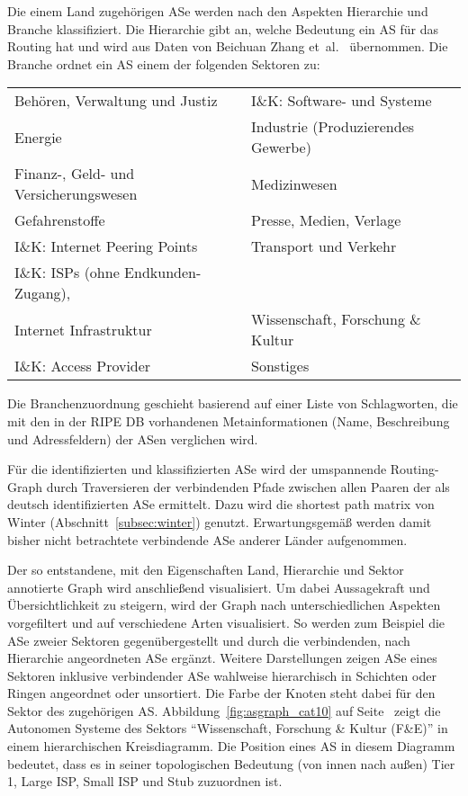 Die einem Land zugehörigen ASe werden nach den Aspekten Hierarchie und Branche klassifiziert.
Die Hierarchie gibt an, welche Bedeutung ein AS für das Routing hat und wird aus Daten von Beichuan Zhang et~al.~\cite{Zhang:2005:CIA:1052812.1052825} übernommen.
Die Branche ordnet ein AS einem der folgenden Sektoren zu:
\begin{center}
  \begin{tabular}[h]{ll}
    \hline
    Behören, Verwaltung und Justiz & I\&K: Software- und Systeme \\
    Energie & Industrie (Produzierendes Gewerbe) \\
    Finanz-, Geld- und Versicherungswesen & Medizinwesen \\
    Gefahrenstoffe & Presse, Medien, Verlage \\
    I\&K: Internet Peering Points & Transport und Verkehr \\
    I\&K: ISPs (ohne Endkunden-Zugang),\\
    Internet Infrastruktur & Wissenschaft, Forschung \& Kultur \\
    I\&K: Access Provider & Sonstiges \\
    \hline
  \end{tabular}
\end{center}
Die Branchenzuordnung geschieht basierend auf einer Liste von Schlagworten, die mit den in der RIPE DB vorhandenen Metainformationen (Name, Beschreibung und Adressfeldern) der ASen verglichen wird.

Für die identifizierten und klassifizierten ASe wird der umspannende Routing-Graph durch Traversieren der verbindenden Pfade zwischen allen Paaren der als deutsch identifizierten ASe ermittelt.
Dazu wird die shortest path matrix von Winter (\vgl Abschnitt~\ref{subsec:winter}) genutzt.
Erwartungsgemäß werden damit bisher nicht betrachtete verbindende ASe anderer Länder aufgenommen.

Der so entstandene, mit den Eigenschaften Land, Hierarchie und Sektor annotierte Graph wird anschließend visualisiert.
Um dabei Aussagekraft und Übersichtlichkeit zu steigern, wird der Graph nach unterschiedlichen Aspekten vorgefiltert und auf verschiedene Arten visualisiert.
So werden zum Beispiel die ASe zweier Sektoren gegenübergestellt und durch die verbindenden, nach Hierarchie angeordneten ASe ergänzt.
Weitere Darstellungen zeigen ASe eines Sektoren inklusive verbindender ASe wahlweise hierarchisch in Schichten oder Ringen angeordnet oder unsortiert.
Die Farbe der Knoten steht dabei für den Sektor des zugehörigen AS.
Abbildung~\ref{fig:asgraph_cat10} auf Seite~\pageref{fig:asgraph_cat10} zeigt die Autonomen Systeme des Sektors "`Wissenschaft, Forschung \& Kultur (F\&E)"' in einem hierarchischen Kreisdiagramm.
Die Position eines AS in diesem Diagramm bedeutet, dass es in seiner topologischen Bedeutung (von innen nach außen) Tier 1, Large ISP, Small ISP und Stub zuzuordnen ist.

